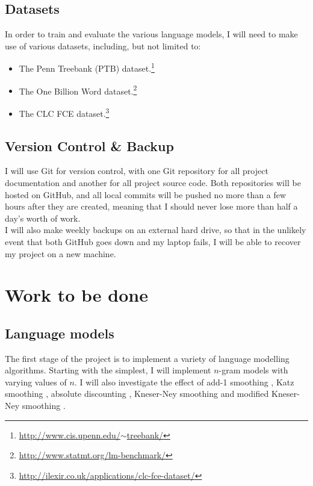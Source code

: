 \documentclass[a4paper, 12pt]{article}
\newcommand{\hlink}[2]{{\href{#1}{#2}}}
\begin{document}
\subsection*{Datasets}
In order to train and evaluate the various language models, I will need to make use of various datasets, including, but not limited to:
\begin{itemize}
\item
	The Penn Treebank (PTB) dataset.\footnote{\hlink{http://www.cis.upenn.edu/~treebank/}{http://www.cis.upenn.edu/$\sim$treebank/}}
\item
	The One Billion Word dataset.\footnote{\hlink{http://www.statmt.org/lm-benchmark/}{http://www.statmt.org/lm-benchmark/}}
\item
	The CLC FCE dataset.\footnote{\hlink{http://ilexir.co.uk/applications/clc-fce-dataset/}{http://ilexir.co.uk/applications/clc-fce-dataset/}}
\end{itemize}

\subsection*{Version Control \& Backup}
I will use Git for version control, with one Git repository for all project documentation and another for all project source code. Both repositories will be hosted on GitHub, and all local commits will be pushed no more than a few hours after they are created, meaning that I should never lose more than half a day's worth of work. \\

I will also make weekly backups on an external hard drive, so that in the unlikely event that both GitHub goes down and my laptop fails, I will be able to recover my project on a new machine.

\section*{Work to be done}

\subsection*{Language models}
The first stage of the project is to implement a variety of language modelling algorithms. Starting with the simplest, I will implement $n$-gram models with varying values of $n$. I will also investigate the effect of add-1 smoothing \cite{add1}, Katz smoothing \cite{katz}, absolute discounting \cite{absdisc}, Kneser-Ney smoothing \cite{kneser} and modified Kneser-Ney smoothing \cite{modkneser}. \\
\end{document}
